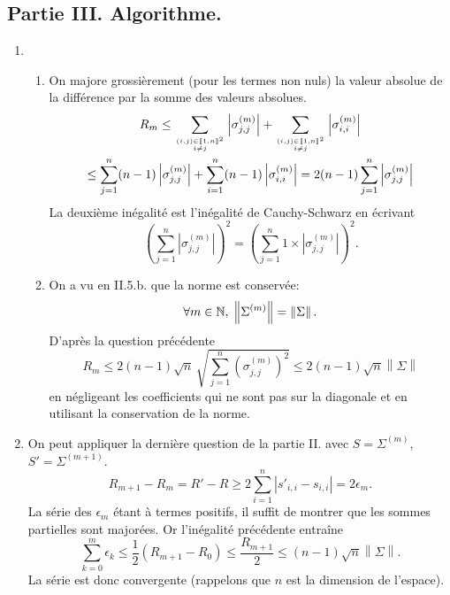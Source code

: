 \subsection*{Partie III. Algorithme.}
\begin{enumerate}
 \item 
\begin{enumerate}
 \item On majore grossièrement (pour les termes non nuls) la valeur absolue de la différence par la somme des valeurs absolues.
\begin{multline*}
R_m \leq \sum_{\empil{(i,j)\in \llbracket 1,n \rrbracket^2}{i\neq j}} \left| \sigma_{j,j}^{(m)}\right|
 + \sum_{\empil{(i,j)\in \llbracket 1,n \rrbracket^2}{i\neq j}} \left|\sigma_{i,i}^{(m)}\right|\\
\leq \sum_{j=1}^n(n-1) \left| \sigma_{j,j}^{(m)}\right| + \sum_{i=1}^n(n-1) \left| \sigma_{i,i}^{(m)}\right|
= 2 (n-1)\sum_{j=1}^n \left| \sigma_{j,j}^{(m)}\right|
\end{multline*}
La deuxième inégalité est l'inégalité de Cauchy-Schwarz en écrivant
\begin{displaymath}
 \left( \sum_{j=1}^n \left|\sigma_{j,j}^{(m)}\right|\right)^2
 = \left( \sum_{j=1}^n 1 \times \left| \sigma_{j,j}^{(m)}\right|\right)^2.
\end{displaymath}

 \item On a vu en II.5.b. que la norme est conservée:
\begin{displaymath}
\forall m\in \mathbb{N},\; \left\| \Sigma^{(m)} \right\| = \left\| \Sigma \right\|. 
\end{displaymath}
D'après la question précédente
\begin{displaymath}
R_m \leq 2 (n-1) \sqrt{n} \, \sqrt{\sum_{j=1}^n (\sigma_{j,j}^{(m)})^2 } 
\leq 2 (n-1) \sqrt{n} \left\| \Sigma \right\|
\end{displaymath}
en négligeant les coefficients qui ne sont pas sur la diagonale et en utilisant la conservation de la norme.
\end{enumerate}
 
 \item On peut appliquer la dernière question de la partie II. avec $S = \Sigma^{(m)}$, $S' = \Sigma^{(m+1)}$.
\begin{displaymath}
R_{m+1} - R_m = R' - R \geq 2 \sum_{i=1}^n |s'_{i,i} - s_{i,i}| = 2\epsilon_m. 
\end{displaymath}
La série des $\epsilon_m$ étant à termes positifs, il suffit de montrer que les sommes partielles sont majorées. Or l'inégalité précédente entraîne
\begin{displaymath}
 \sum_{k=0}^{m} \epsilon_k \leq \frac{1}{2}\left(R_{m+1} -R_0\right) 
 \leq \frac{R_{m+1}}{2} \leq (n-1)\sqrt{n} \left\|\Sigma \right\|.
\end{displaymath}
La série est donc convergente (rappelons que $n$ est la dimension de l'espace).
 

\end{enumerate}
